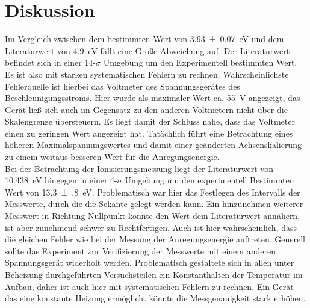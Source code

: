 \section{Diskussion}
Im Vergleich zwischen dem bestimmten Wert von \SI{3.93(7)}{\electronvolt} und dem
Literaturwert von \SI{4.9}{\electronvolt}\cite{Anregungsenergie} fällt eine Große
Abweichung auf. Der Literaturwert befindet sich in einer 14-$\sigma$ Umgebung
um den Experimentell bestimmten Wert. Es ist also mit starken systematischen Fehlern
zu rechnen. Wahrscheinlichste Fehlerquelle ist hierbei das Voltmeter des Spannungsgerätes
des Beschleunigungsstroms. Hier wurde als maximaler Wert ca. \SI{55}{\volt} angezeigt,
das Gerät ließ sich auch im Gegensatz zu den anderen Voltmetern nicht über die Skalengrenze
übersteuern. Es liegt damit der Schluss nahe, dass das Voltmeter einen zu geringen
Wert angezeigt hat. Tatächlich führt eine Betrachtung eines höheren Maximalspannungswertes
und damit einer geänderten Achsenskalierung zu einem weitaus besseren Wert für die
Anregungsenergie.\\
\noindent
Bei der Betrachtung der Ionisierungsmessung liegt der Literaturwert von
\SI{10.438}{\electronvolt} \cite{Ionisierungsenergie}
hingegen in einer 4-$\sigma$ Umgebung um den experimentell Bestimmten Wert von
\SI{13.3(8)}{\electronvolt}.
Problematisch war hier das Festlegen des Intervalls der Messwerte, durch die die Sekante
gelegt werden kann. Ein hinzunehmen weiterer Messwert in Richtung Nullpunkt könnte den
Wert dem Literaturwert annähern, ist aber zunehmend schwer zu Rechtfertigen. Auch ist
hier wahrscheinlich, dass die gleichen Fehler wie bei der Messung der Anregungsenergie
auftreten. Generell sollte das Experiment zur Verifizierung der Messwerte mit einem
anderen Spannungsgerät widerholt werden. Problematisch gestaltete sich in allen
unter Beheizung durchgeführten Versuchsteilen ein Konstanthalten der Temperatur
im Aufbau, daher ist auch hier mit systematischen Fehlern zu rechnen.
Ein Gerät das eine konstante Heizung ermöglicht könnte die Messgenauigkeit stark
erhöhen.
\newpage
\nocite{*}
\printbibliography
